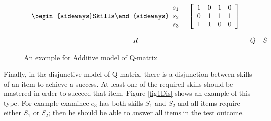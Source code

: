 \begin{figure}
\begin{footnotesize}
\[\begin{array}{ccc}
\begin{array}{cc}
\mathrm{\begin{sideways}Skills\end{sideways}}\begin{array}{c}
s_{1}\\
s_{2}\\
s_{3}
\end{array} & \left[\begin{array}{cccc}
1 & 0 & 1 & 0\\
0 & 1 & 1 & 1\\
1 & 1 & 0 & 0
\end{array}\right]
\end{array}\\
\\
R & Q & S
\end{array}
\]
 \end{footnotesize} \caption{An example for Additive model of Q-matrix}


\label{fig1Add} 
\end{figure}

Finally, in the disjunctive model of Q-matrix, there is a disjunction between skills of an item to achieve a success. At least one of the required skills should be mastered in order to succeed that item. Figure \ref{fig1Dis} shows an example of this type. For example examinee $e_{3}$ has both skills $S_{1}$ and $S_{2}$ and all items require either $S_{1}$ or $S_{2}$; then he should be able to answer all items in the test outcome. 



